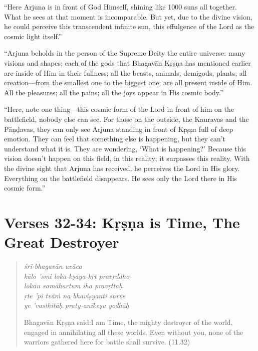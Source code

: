 \documentclass[12pt, twoside, openright]{memoir}
\begin{document}
\enquote{Here Arjuna is in front of God Himself, shining like 1000 suns all together. What he sees at that moment is incomparable. But yet, due to the divine vision, he could perceive this transcendent infinite sun, this effulgence of the Lord as the cosmic light itself.}

\enquote{Arjuna beholds in the person of the Supreme Deity the entire universe: many visions and shapes; each of the gods that Bhagavān Kṛṣṇa has mentioned earlier are inside of Him in their fullness; all the beasts, animals, demigods, plants; all creation---from the smallest one to the biggest one; are all present inside of Him. All the pleasures; all the pains; all the joys appear in His cosmic body.}

\enquote{Here, note one thing---this cosmic form of the Lord in front of him on the battlefield, nobody else can see. For those on the outside, the Kauravas and the Pāṇḍavas, they can only see Arjuna standing in front of Kṛṣṇa full of deep emotion. They can feel that something else is happening, but they can’t understand what it is. They are wondering, \enquote{What is happening?} Because this vision doesn’t happen on this field, in this reality; it surpasses this reality. With the divine sight that Arjuna has received, he perceives the Lord in His glory. Everything on the battlefield disappears. He sees only the Lord there in His cosmic form.}

\section{Verses 32-34: Kṛṣṇa is Time, The Great Destroyer}\label{sec-verses-32-34-krsna-is-time-the-great-destroyer}


\par
\begin{verse}
\textit{śrī-bhagavān uvāca} \\
\textit{kālo ’smi loka-kṣaya-kṛt pravṛddho} \\
\textit{lokān samāhartum iha pravṛttaḥ} \\
\textit{ṛte ’pi tvāṁ na bhaviṣyanti sarve} \\
\textit{ye ’vasthitāḥ praty-anīkeṣu yodhāḥ}

\noindent \quad Bhagavān Kṛṣṇa said:\linebreak I am Time, the mighty destroyer of the world, engaged in annihilating all these worlds. Even without you, none of the warriors gathered here for battle shall survive. (11.32)
\end{verse}
\par
\end{document}
